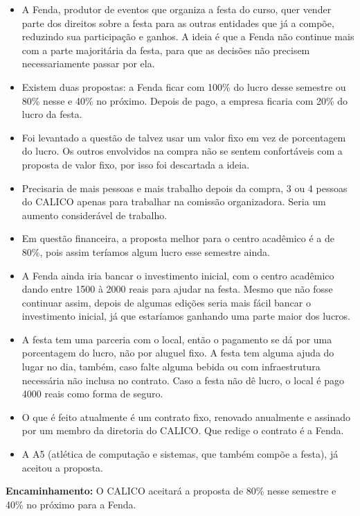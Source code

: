 \documentclass{ata-calico}
\begin{document}
\begin{itemize}
\item A Fenda, produtor de eventos que organiza a festa do curso, quer vender parte dos direitos sobre a festa para as outras entidades que já a compõe, reduzindo sua participação e ganhos. A ideia é que a Fenda não continue mais com a parte majoritária da festa, para que as decisões não  precisem necessariamente passar por ela.
\item Existem duas propostas: a Fenda ficar com 100\% do lucro desse semestre ou 80\% nesse e 40\% no próximo. Depois de pago, a empresa ficaria com 20\% do lucro da festa.
\item Foi levantado a questão de talvez usar um valor fixo em vez de porcentagem do lucro. Os outros envolvidos na compra não se sentem confortáveis com a proposta de valor fixo, por isso foi descartada a ideia.
\item Precisaria de mais pessoas e mais trabalho depois da compra, 3 ou 4 pessoas do CALICO apenas para trabalhar na comissão organizadora. Seria um aumento considerável de trabalho.
\item Em questão financeira, a proposta melhor para o centro acadêmico é a de 80\%, pois assim teríamos algum lucro esse semestre ainda.
\item A Fenda ainda iria bancar o investimento inicial, com o centro acadêmico dando entre 1500 à 2000 reais para ajudar na festa. Mesmo que não fosse continuar assim, depois de algumas edições seria mais fácil bancar o investimento inicial, já que estaríamos ganhando uma parte maior dos lucros.
\item A festa tem uma parceria com o local, então o pagamento se dá por uma porcentagem do lucro, não por aluguel fixo. A festa tem alguma ajuda do lugar no dia, também, caso falte alguma bebida ou com infraestrutura necessária não inclusa no contrato. Caso a festa não dê lucro, o local é pago 4000 reais como forma de seguro.
\item O que é feito atualmente é um contrato fixo, renovado anualmente e assinado por um membro da diretoria do CALICO. Que redige o contrato é a Fenda.
\item A A5 (atlética de computação e sistemas, que também compõe a festa), já aceitou a proposta.
\end{itemize}

\textbf{Encaminhamento:} O CALICO aceitará a proposta de 80\% nesse semestre e 40\% no próximo para a Fenda.

\end{document}
